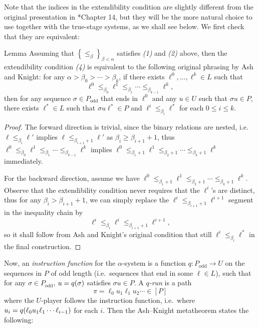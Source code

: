 \documentclass[11pt]{article}
\makeatletter
\theoremstyle{plain}
\newcommand{\@thistheoremname}{}
\newtheorem*{@theorem*}{\@thistheoremname}
\newenvironment{theorem*}[1]
  {\renewcommand{\@thistheoremname}{#1}%
   \begin{@theorem*}}
  {\end{@theorem*}}
\theoremstyle{definition}
\makeatother
\begin{document}
Note that the indices in the extendibility condition are slightly different from the original presentation in \cite{ash-knight00-computable-structures}*{Chapter 14}, but they will be the more natural choice to use together with the true-stage systems, as we shall see below. We first check that they are equivalent:

\begin{theorem*}{Lemma}
  Assuming that $\left\{\leq_\beta\right\}_{\beta < \alpha}$ satisfies \emph{(1)} and \emph{(2)} above, then the extendibility condition \emph{(4)} is equivalent to the following original phrasing by Ash and Knight: for any $\alpha > \beta_0 > \cdots > \beta_k$, if there exists $\ell^0, \ldots, \ell^k \in L$ such that
  \[\ell^0 \leq_{\beta_0} \ell^1 \leq_{\beta_1} \cdots \leq_{\beta_{k-1}} \ell^k,\]
  then for any sequence $\sigma \in P_\text{odd}$ that ends in $\ell^0$ and any $u \in U$ such that $\sigma u \in P$, there exists $\ell^* \in L$ such that $\sigma u \ell^* \in P$ and $\ell^i \leq_{\beta_i} \ell^*$ for each $0 \leq i \leq k$.
\end{theorem*}

\begin{proof}
  The forward direction is trivial, since the binary relations are nested, i.e.\ $\ell \leq_{\beta_i} \ell'$ implies $\ell \leq_{\beta_{i + 1} + 1} \ell'$ as $\beta_i \geq \beta_{i + 1} + 1$, thus $\ell^0 \leq_{\beta_0} \ell^1 \leq_{\beta_1} \cdots \leq_{\beta_{k-1}} \ell^k$ implies $\ell^0 \leq_{\beta_1 + 1} \ell^1 \leq_{\beta_2 + 1} \cdots \leq_{\beta_k + 1} \ell^k$ immediately.

  For the backward direction, assume we have $\ell^0 \leq_{\beta_1 + 1} \ell^1 \leq_{\beta_2 + 1} \cdots \leq_{\beta_k + 1} \ell^k$. Observe that the extendibility condition never requires that the $\ell^i$'s are distinct, thus for any $\beta_i > \beta_{i + 1} + 1$, we can simply replace the $\ell^i \leq_{\beta_{i + 1} + 1} \ell^{i + 1}$ segment in the inequality chain by
  \[\ell^i \leq_{\beta_i} \ell^i \leq_{\beta_{i + 1} + 1} \ell^{i + 1},\]
  so it shall follow from Ash and Knight's original condition that still $\ell^i \leq_{\beta_i} \ell^*$ in the final construction.
\end{proof}

Now, an \emph{instruction function} for the $\alpha$-system is a function $q : P_\text{odd} \rightarrow U$ on the sequences in $P$ of odd length (i.e.\ sequences that end in some $\ell \in L$), such that for any $\sigma \in P_\text{odd}$, $u = q\mleft(\sigma\mright)$ satisfies $\sigma u \in P$. A \emph{$q$-run} is a path
\[\pi = \ell_0 u_1 \ell_1 u_2 \cdots \in \left[P\right]\]
where the $U$-player follows the instruction function, i.e.\ where $u_i = q\mleft(\ell_0 u_1 \ell_1 \cdots \ell_{i - 1}\mright)$ for each $i$. Then the Ash--Knight metatheorem states the following:
\end{document}
